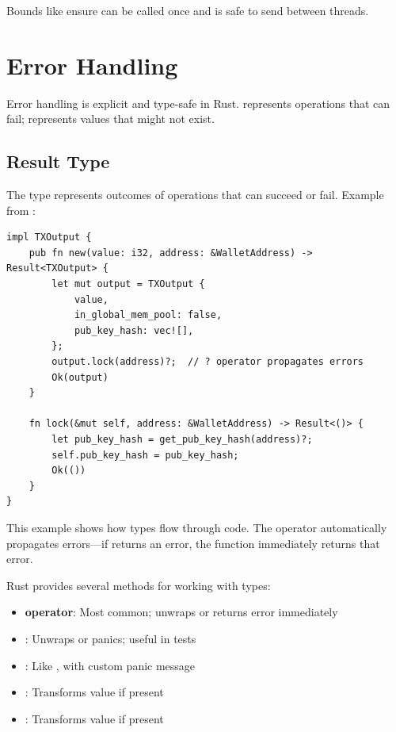 Bounds like  ensure  can be called once and is safe to send between threads.

\section{Error Handling}
\label{sec:ch24-error-handling}

Error handling is explicit and type-safe in Rust.  represents operations that can fail;  represents values that might not exist.

\subsection{Result Type}
\label{subsec:ch24-result}

The  type represents outcomes of operations that can succeed or fail. Example from :

\begin{listing}[htbp]
\caption{Result type in transaction output creation}
\label{lst:ch24-result}
\begin{verbatim}
impl TXOutput {
    pub fn new(value: i32, address: &WalletAddress) -> Result<TXOutput> {
        let mut output = TXOutput {
            value,
            in_global_mem_pool: false,
            pub_key_hash: vec![],
        };
        output.lock(address)?;  // ? operator propagates errors
        Ok(output)
    }

    fn lock(&mut self, address: &WalletAddress) -> Result<()> {
        let pub_key_hash = get_pub_key_hash(address)?;
        self.pub_key_hash = pub_key_hash;
        Ok(())
    }
}
\end{verbatim}
\end{listing}

This example shows how  types flow through code. The  operator automatically propagates errors---if  returns an error, the function immediately returns that error.

Rust provides several methods for working with  types:
\begin{itemize}
  \item \textbf{ operator}: Most common; unwraps  or returns error immediately
  \item \textbf{}: Unwraps  or panics; useful in tests
  \item \textbf{}: Like , with custom panic message
  \item \textbf{}: Transforms  value if present
  \item \textbf{}: Transforms  value if present
\end{itemize}

